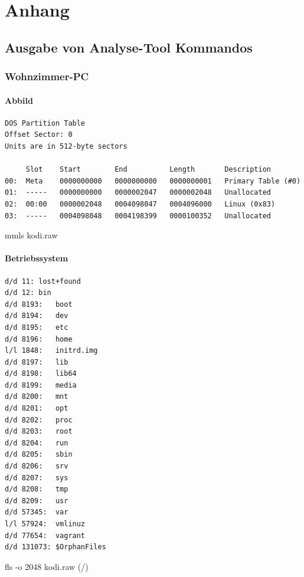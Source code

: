 \appendix

\chapter{Anhang}
\label{chap:appendix}

\section{Ausgabe von Analyse-Tool Kommandos}

\subsection{Wohnzimmer-PC}

\subsubsection{Abbild}

\begin{cmd}[H]
\begin{verbatim}
DOS Partition Table
Offset Sector: 0
Units are in 512-byte sectors

     Slot    Start        End          Length       Description
00:  Meta    0000000000   0000000000   0000000001   Primary Table (#0)
01:  -----   0000000000   0000002047   0000002048   Unallocated
02:  00:00   0000002048   0004098047   0004096000   Linux (0x83)
03:  -----   0004098048   0004198399   0000100352   Unallocated
\end{verbatim}
\caption{mmls kodi.raw}
\label{cmd:kodi-mmls}
\end{cmd}

\subsubsection{Betriebssystem}

\begin{cmd}[H]
\begin{verbatim}
d/d 11:	lost+found
d/d 12:	bin
d/d 8193:	boot
d/d 8194:	dev
d/d 8195:	etc
d/d 8196:	home
l/l 1848:	initrd.img
d/d 8197:	lib
d/d 8198:	lib64
d/d 8199:	media
d/d 8200:	mnt
d/d 8201:	opt
d/d 8202:	proc
d/d 8203:	root
d/d 8204:	run
d/d 8205:	sbin
d/d 8206:	srv
d/d 8207:	sys
d/d 8208:	tmp
d/d 8209:	usr
d/d 57345:	var
l/l 57924:	vmlinuz
d/d 77654:	vagrant
d/d 131073:	$OrphanFiles
\end{verbatim}
\caption{fls -o 2048 kodi.raw (/)}
\label{cmd:kodi-rootdir}
\end{cmd}

